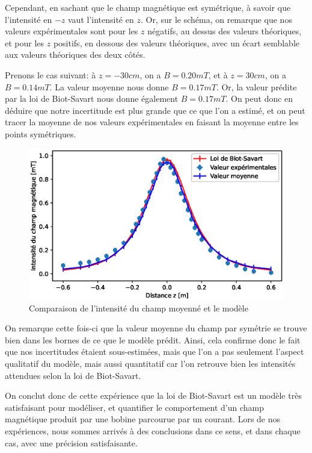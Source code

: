 \documentclass[12pt]{article}
\begin{document}
Cependant, en sachant que le champ magnétique est symétrique, à savoir que l'intensité
en $-z$ vaut l'intensité en $z$. Or, sur le schéma, on remarque que nos valeurs expérimentales sont pour les $z$ négatifs, au dessus des valeurs théoriques, et pour
les $z$ positifs, en dessous des valeurs théoriques, avec un écart semblable aux valeurs théoriques des deux côtés. 

Prenons le cas suivant:
à $z=-30cm$, on a $B = 0.20mT$, et à $z=30cm$, on a $B = 0.14mT$. La valeur moyenne nous donne $B = 0.17mT$. Or, la valeur prédite par 
la loi de Biot-Savart nous donne également $B = 0.17mT$. On peut donc en déduire que notre incertitude est plus grande que ce que l'on a estimé, et on peut tracer la moyenne de nos valeurs
expérimentales en faisant la moyenne entre les points symétriques.

\newpage

\begin{figure}[h!]
    \begin{center}
        \includegraphics[scale=0.8]{img/Moyenne.eps}
    \end{center}
    \caption{Comparaison de l'intensité du champ moyenné et le modèle}
\end{figure}

On remarque cette fois-ci que la valeur moyenne du champ par symétrie se trouve bien dans les bornes de ce que le modèle prédit. Ainsi,
cela confirme donc le fait que nos incertitudes étaient sous-estimées, mais que l'on a pas seulement l'aspect qualitatif du modèle, mais aussi quantitatif
car l'on retrouve bien les intensités attendues selon la loi de Biot-Savart.

On conclut donc de cette expérience que la loi de Biot-Savart est un modèle très satisfaisant pour modéliser, et quantifier
le comportement d'un champ magnétique produit par une bobine parcourue par un courant. Lors de nos expériences, nous sommes arrivés
à des conclusions dans ce sens, et dans chaque cas, avec une précision satisfaisante.
\end{document}

